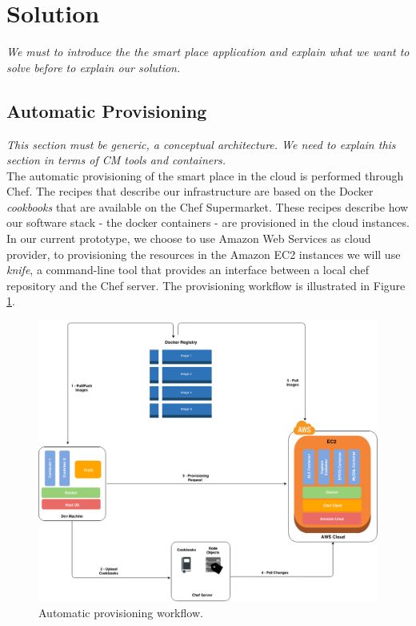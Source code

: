 \section{Solution}
\label{sec:solution}
\textit{We must to introduce the the smart place application and explain what we want to solve
before to explain our solution.}\\

\subsection{Automatic Provisioning}
\label{sub:automatic_provisioning}

\textit{This section must be generic, a conceptual architecture. We need to explain this section in
terms of CM tools and containers.}\\

The automatic provisioning of the smart place in the cloud is performed through Chef. The recipes
that describe our infrastructure are based on the Docker \textit{cookbooks} that are available on the Chef
Supermarket. These recipes describe how our software stack - the docker containers - are provisioned
in the cloud instances. In our current prototype, we choose to use Amazon Web Services as cloud provider,
to provisioning the resources in the Amazon EC2 instances we will use \textit{knife}, a
command-line tool that provides an interface between a local chef repository and the Chef server.
The provisioning workflow is illustrated in Figure \ref{fig:automatic_provisioning}.
\begin{figure}[!ht]
  \centering
  \includegraphics[width=\textwidth]{images/docker-c4t}
  \caption{Automatic provisioning workflow.}
  \label{fig:automatic_provisioning}
\end{figure}

